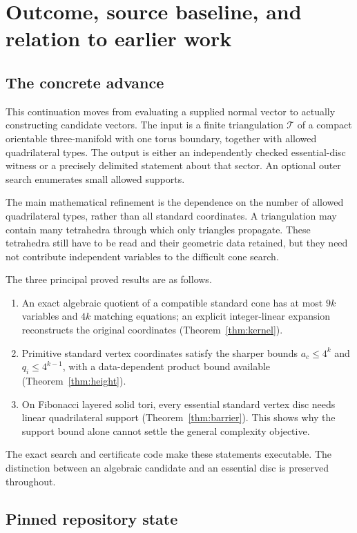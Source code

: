 \documentclass[11pt]{article}
\theoremstyle{definition}
\theoremstyle{remark}
\begin{document}
\section{Outcome, source baseline, and relation to earlier work}
\label{sec:outcome}

\subsection{The concrete advance}

This continuation moves from evaluating a supplied normal vector to actually
constructing candidate vectors. The input is a finite triangulation $\mathcal T$
of a compact orientable three-manifold with one torus boundary, together with
allowed quadrilateral types. The output is either an independently checked
essential-disc witness or a precisely delimited statement about that sector.
An optional outer search enumerates small allowed supports.

The main mathematical refinement is the dependence on the number of allowed
quadrilateral types, rather than all standard coordinates. A triangulation may
contain many tetrahedra through which only triangles propagate. These tetrahedra
still have to be read and their geometric data retained, but they need not
contribute independent variables to the difficult cone search.

The three principal proved results are as follows.
\begin{enumerate}
\item An exact algebraic quotient of a compatible standard cone has at most
  $9k$ variables and $4k$ matching equations; an explicit integer-linear expansion
  reconstructs the original coordinates (Theorem~\ref{thm:kernel}).
\item Primitive standard vertex coordinates satisfy the sharper bounds
  $a_c\le4^k$ and $q_i\le4^{k-1}$, with a data-dependent product bound available
  (Theorem~\ref{thm:height}).
\item On Fibonacci layered solid tori, every essential standard vertex disc
  needs linear quadrilateral support (Theorem~\ref{thm:barrier}). This shows why
  the support bound alone cannot settle the general complexity objective.
\end{enumerate}
The exact search and certificate code make these statements executable.
The distinction between an algebraic candidate and an essential disc is
preserved throughout.

\subsection{Pinned repository state}
\end{document}
